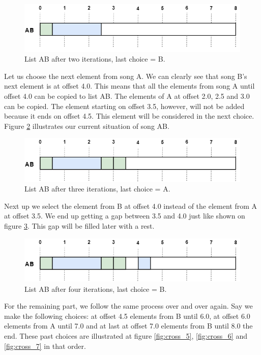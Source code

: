 \documentclass[a4paper]{article}
\begin{document}
\begin{figure}[H]
	\includegraphics[width=\textwidth]{Fotos/crossover/2nd.png}
	\caption{List AB after two iterations, last choice = B.}
	\label{fig:cross_2}
\end{figure}

Let us choose the next element from song A. We can clearly see that song B's next element is at offset 4.0. This means that all the elements from song A until offset 4.0 can be copied to list AB. The elements of A at offset 2.0, 2.5 and 3.0 can be copied. The element starting on offset 3.5, however, will not be added because it ends on offset 4.5. This element will be considered in the next choice. Figure \ref{fig:cross_3} illustrates our current situation of song AB.

\begin{figure}[H]
	\includegraphics[width=\textwidth]{Fotos/crossover/3th.png}
	\caption{List AB after three iterations, last choice = A.}
	\label{fig:cross_3}
\end{figure}
Next up we select the element from B at offset 4.0 instead of the element from A at offset 3.5. We end up getting a gap between 3.5 and 4.0 just like shown on figure \ref{fig:cross_4}. This gap will be filled later with a rest.

\begin{figure}[H]
	\includegraphics[width=\textwidth]{Fotos/crossover/4th.png}
	\caption{List AB after four iterations, last choice = B.}
	\label{fig:cross_4}
	
\end{figure}
For the remaining part, we follow the same process over and over again. Say we make the following choices: at offset 4.5 elements from B until 6.0, at offset 6.0 elements from A until 7.0 and at last at offset 7.0 elements from B until 8.0 the end. These past choices are illustrated at figure \ref{fig:cross_5}, \ref{fig:cross_6} and \ref{fig:cross_7} in that order.
\end{document}
